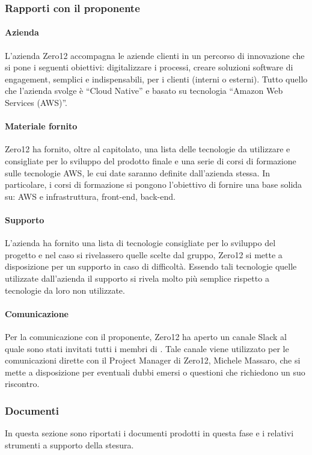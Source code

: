 \subsubsection{Rapporti con il proponente}
\paragraph{Azienda}
L’azienda Zero12 accompagna le aziende clienti in un percorso di innovazione che si pone i
seguenti obiettivi: digitalizzare i processi, creare soluzioni software di engagement, semplici e
indispensabili, per i clienti (interni o esterni). Tutto quello che l’azienda svolge è “Cloud Native\glo{}” e basato su tecnologia “Amazon Web Services\glo{} (AWS)”.

\paragraph{Materiale fornito}
Zero12 ha fornito, oltre al capitolato, una lista delle tecnologie da utilizzare e consigliate per lo
sviluppo del prodotto finale e una serie di corsi di formazione sulle tecnologie AWS, le cui date
saranno definite dall’azienda stessa. In particolare, i corsi di formazione si pongono l'obiettivo di fornire una base solida su: AWS e infrastruttura, front-end\glo{}, back-end\glo{}.

\paragraph{Supporto}
L’azienda ha fornito una lista di tecnologie consigliate per lo sviluppo del progetto e nel caso si
rivelassero quelle scelte dal gruppo, Zero12 si mette a disposizione per un supporto in caso di
difficoltà. Essendo tali tecnologie quelle utilizzate dall’azienda il supporto si rivela molto più
semplice rispetto a tecnologie da loro non utilizzate.

\paragraph{Comunicazione}
Per la comunicazione con il proponente, Zero12 ha aperto un canale Slack\glo{} al quale sono stati
invitati tutti i membri di \groupName{}. Tale canale viene utilizzato per le comunicazioni dirette
con il Project Manager di Zero12, Michele Massaro, che si mette a disposizione per eventuali
dubbi emersi o questioni che richiedono un suo riscontro.

\subsubsection{Documenti}
In questa sezione sono riportati i documenti prodotti in questa fase e i relativi strumenti a supporto della stesura.

